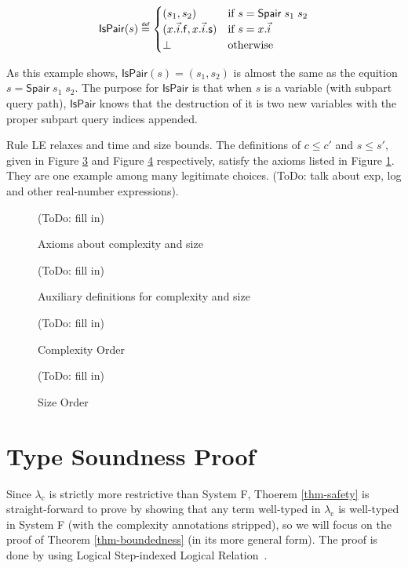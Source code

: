 \documentclass[preprint]{sigplanconf}
\newcommand{\symf}{\mathsf{f}}
\newcommand{\syms}{\mathsf{s}}
\newcommand{\symSpair}{\mathsf{Spair}}
\newcommand\defeq{\mathrel{\overset{\makebox[0pt]{\mbox{\normalfont\tiny\sffamily def}}}{=}}}
\newcommand{\logo}{\lambda_\mathrm{c}}
\begin{document}
$$
\mathsf{IsPair}(s)\defeq\begin{cases}
(s_1, s_2) & \mbox{if } s = \symSpair\;s_1\;s_2 \\
(x.\vec{i}.\symf, x.\vec{i}.\syms) & \mbox{if } s = x.\vec{i} \\
\bot & \mbox{otherwise}\\
\end{cases}
$$

As this example shows, $\mathsf{IsPair}(s)=(s_1,s_2)$ is almost the same as the equition $s = \symSpair\;s_1\;s_2$. The purpose for $\mathsf{IsPair}$ is that when $s$ is a variable (with subpart query path), $\mathsf{IsPair}$ knows that the destruction of it is two new variables with the proper subpart query indices appended.

Rule {\sc LE} relaxes and time and size bounds. The definitions of $c\leq c'$ and $s\leq s'$, given in Figure \ref{cle} and Figure \ref{sle} respectively, satisfy the axioms listed in Figure \ref{axioms}. They are one example among many legitimate choices. (ToDo: talk about exp, log and other real-number expressions).

\begin{figure}
(ToDo: fill in)
\caption{\label{axioms}Axioms about complexity and size}
\end{figure}

\begin{figure}
(ToDo: fill in)
\caption{\label{cexpr-size-aux}Auxiliary definitions for complexity and size}
\end{figure}

\begin{figure}
\begin{mathpar}
\end{mathpar}
(ToDo: fill in)
\caption{\label{cle}Complexity Order}
\end{figure}

\begin{figure}
\begin{mathpar}
\end{mathpar}
(ToDo: fill in)
\caption{\label{sle}Size Order}
\end{figure}


\section{\label{section-proof}Type Soundness Proof}

Since $\logo$ is strictly more restrictive than System F, Thoerem \ref{thm-safety} is straight-forward to prove by showing that any term well-typed in $\logo$ is well-typed in System F (with the complexity annotations stripped), so we will focus on the proof of Theorem \ref{thm-boundedness} (in its more general form). The proof is done by using Logical Step-indexed Logical Relation~\cite{dreyer2009logical}.
\end{document}
